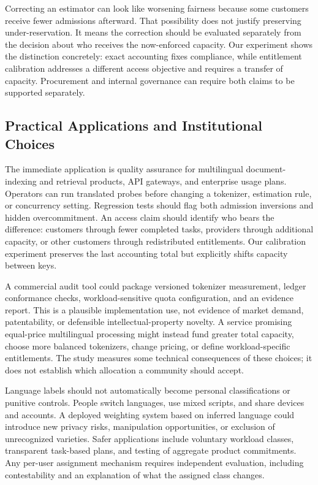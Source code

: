 \documentclass[manuscript,screen]{acmart}
\begin{document}
Correcting an estimator can look like worsening fairness because some customers receive fewer admissions afterward. That possibility does not justify preserving under-reservation. It means the correction should be evaluated separately from the decision about who receives the now-enforced capacity. Our experiment shows the distinction concretely: exact accounting fixes compliance, while entitlement calibration addresses a different access objective and requires a transfer of capacity. Procurement and internal governance can require both claims to be supported separately.

\subsection{Practical Applications and Institutional Choices}
The immediate application is quality assurance for multilingual document-indexing and retrieval products, API gateways, and enterprise usage plans. Operators can run translated probes before changing a tokenizer, estimation rule, or concurrency setting. Regression tests should flag both admission inversions and hidden overcommitment. An access claim should identify who bears the difference: customers through fewer completed tasks, providers through additional capacity, or other customers through redistributed entitlements. Our calibration experiment preserves the last accounting total but explicitly shifts capacity between keys.

A commercial audit tool could package versioned tokenizer measurement, ledger conformance checks, workload-sensitive quota configuration, and an evidence report. This is a plausible implementation use, not evidence of market demand, patentability, or defensible intellectual-property novelty. A service promising equal-price multilingual processing might instead fund greater total capacity, choose more balanced tokenizers, change pricing, or define workload-specific entitlements. The study measures some technical consequences of these choices; it does not establish which allocation a community should accept.

Language labels should not automatically become personal classifications or punitive controls. People switch languages, use mixed scripts, and share devices and accounts. A deployed weighting system based on inferred language could introduce new privacy risks, manipulation opportunities, or exclusion of unrecognized varieties. Safer applications include voluntary workload classes, transparent task-based plans, and testing of aggregate product commitments. Any per-user assignment mechanism requires independent evaluation, including contestability and an explanation of what the assigned class changes.
\end{document}
